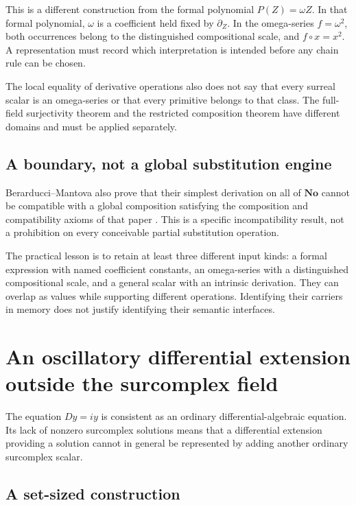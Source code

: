\documentclass[11pt,a4paper]{article}
\numberwithin{equation}{section}
\theoremstyle{definition}
\theoremstyle{remark}
\newcommand{\No}{\mathbf{No}}
\begin{document}
This is a different construction from the formal polynomial
$P(Z)=\omega Z$. In that formal polynomial, $\omega$ is a coefficient
held fixed by $\partial_Z$. In the omega-series $f=\omega^2$, both
occurrences belong to the distinguished compositional scale, and
$f\circ x=x^2$. A representation must record which interpretation is
intended before any chain rule can be chosen.

The local equality of derivative operations also does not say that every
surreal scalar is an omega-series or that every primitive belongs to that
class. The full-field surjectivity theorem and the restricted composition
theorem have different domains and must be applied separately.

\subsection{A boundary, not a global substitution engine}

Berarducci--Mantova also prove that their simplest derivation on all of
$\No$ cannot be compatible with a global composition satisfying the
composition and compatibility axioms of that paper
\cite[Theorem 8.4]{BMGerms}. This is a specific incompatibility result, not
a prohibition on every conceivable partial substitution operation.

The practical lesson is to retain at least three different input kinds:
a formal expression with named coefficient constants, an omega-series with
a distinguished compositional scale, and a general scalar with an
intrinsic derivation. They can overlap as values while supporting different
operations. Identifying their carriers in memory does not justify identifying
their semantic interfaces.

\section{An oscillatory differential extension outside the surcomplex field}
\label{sec:PV}

The equation $Dy=iy$ is consistent as an ordinary differential-algebraic
equation. Its lack of nonzero surcomplex solutions means that a differential
extension providing a solution cannot in general be represented by adding
another ordinary surcomplex scalar.

\subsection{A set-sized construction}
\end{document}
